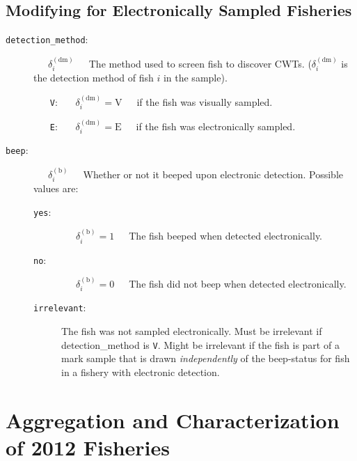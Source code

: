 \documentclass[11pt]{article}
\begin{document}
\subsection{Modifying for Electronically Sampled Fisheries}
\begin{description}
	\item [{\tt detection\_method}:] ~~~$\delta_i^{(\mathrm{dm})}$~~~The method used to screen fish to discover CWTs. ($\delta_i^{(\mathrm{dm})}$ is the detection method of fish $i$ in the sample).
	\begin{itemize}
		\item [{\tt V}:] ~~~$\delta_i^{(\mathrm{dm})} = \mathrm{V}$~~~if the fish was visually sampled.
		\item [{\tt E}:] ~~~$\delta_i^{(\mathrm{dm})} = \mathrm{E}$~~~if the fish was electronically sampled.
	\end{itemize}
	\item [{\tt beep}:] ~~~$\delta_i^{(\mathrm{b})}$~~~Whether or not it beeped upon electronic detection. Possible values are:
	\begin{description}
		\item [{\tt yes}:] ~~~$\delta_i^{(\mathrm{b})} = 1$~~~The fish beeped when detected electronically.
		\item [{\tt no}:]  ~~~$\delta_i^{(\mathrm{b})} = 0$~~~The fish did not beep when detected electronically.
		\item [{\tt irrelevant}:] The fish was not sampled electronically.
		Must be irrelevant if detection\_method is {\tt V}. Might be irrelevant if the fish is part of a
		mark sample that is drawn {\em independently} of the beep-status for fish in a fishery with
		electronic detection.
	\end{description}

\end{description}

\section{Aggregation and Characterization of 2012 Fisheries \label{sec:agg}}
\end{document}
